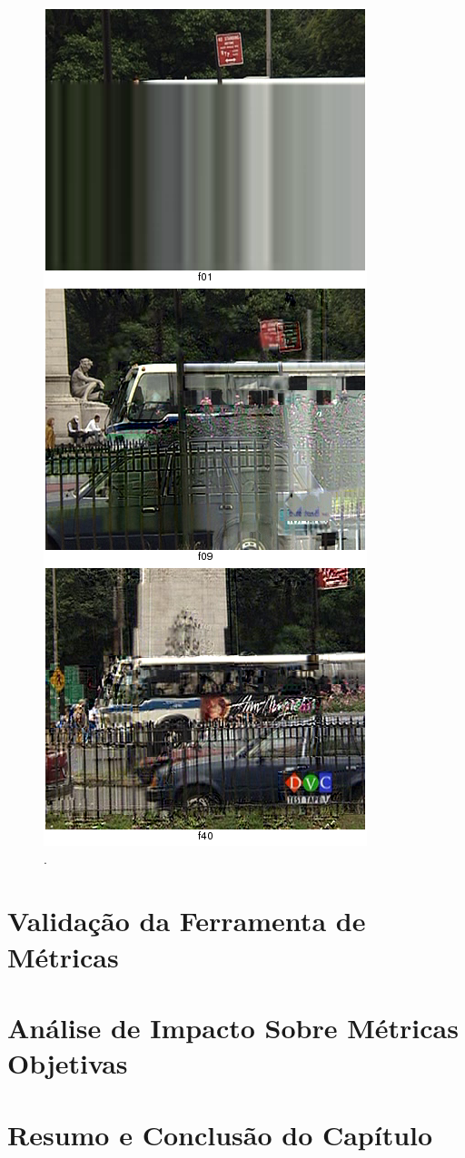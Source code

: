 \begin{figure}[!htb]
	\centering
	\includegraphics[height=0.9\textheight]{./imgs/netsimresult.png}
	\caption{.}
	\label{fig:netsim}
\end{figure}

\section{Validação da Ferramenta de Métricas}

\section{Análise de Impacto Sobre Métricas Objetivas}

\section{Resumo e Conclusão do Capítulo}
